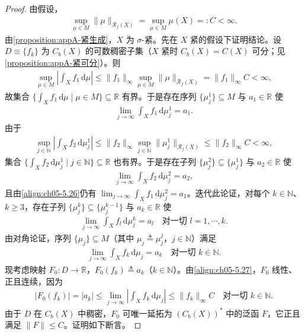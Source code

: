 \documentclass[../../main.tex]{subfiles}%
\begin{document}
\begin{proof}
由假设，
\begin{align}
\sup_{\mu\in M}\|\mu\|_{\mathscr{R}_f(X)}
=\sup_{\mu\in M}\mu(X)=:C<\infty.\label{align:ch05-5.25}
\end{align}
由\cref{proposition:appA-紧生成}，$X$ 为 $\sigma$-紧。先在 $X$ 紧的假设下证明结论。设 $D\equiv\{f_k\}$ 为 $C_b(X)$ 的可数稠密子集（$X$ 紧时 $C_b(X)=C(X)$ 可分；见\cref{proposition:appA-紧可分}）。则
\begin{align*}
\sup_{\mu\in M}\left|\int_X f_1\,\mathrm{d}\mu\right|
\leqslant\|f_1\|_\infty\sup_{\mu\in M}\|\mu\|_{\mathscr{R}_f(X)}
=\|f_1\|_\infty C<\infty,
\end{align*}
故集合 $\{\int_X f_1\,\mathrm{d}\mu\mid\mu\in M\}\subseteq\mathbb{R}$ 有界。于是存在序列 $\{\mu_j^1\}\subseteq M$ 与 $a_1\in\mathbb{R}$ 使
\begin{align}
\lim_{j\to\infty}\int_X f_1\,\mathrm{d}\mu_j^1=a_1.\label{align:ch05-5.26}
\end{align}
由于
\begin{align*}
\sup_{j\in\mathbb{N}}\left|\int_X f_2\,\mathrm{d}\mu_j^1\right|
\leqslant\|f_2\|_\infty\sup_{j\in\mathbb{N}}\|\mu_j^1\|_{\mathscr{R}_f(X)}
\leqslant\|f_2\|_\infty C<\infty,
\end{align*}
集合 $\{\int_X f_2\,\mathrm{d}\mu_j^1\mid j\in\mathbb{N}\}\subseteq\mathbb{R}$ 也有界。于是存在子列 $\{\mu_j^2\}\subseteq\{\mu_j^1\}$ 与 $a_2\in\mathbb{R}$ 使
\begin{align*}
\lim_{j\to\infty}\int_X f_2\,\mathrm{d}\mu_j^2=a_2,
\end{align*}
且由\eqref{align:ch05-5.26}仍有 $\lim_{j\to\infty}\int_X f_1\,\mathrm{d}\mu_j^2=a_1$。迭代此论证，对每个 $k\in\mathbb{N}$、$k\geqslant3$，存在子列 $\{\mu_j^k\}\subseteq\{\mu_j^{k-1}\}$ 与 $a_k\in\mathbb{R}$ 使
\begin{align*}
\lim_{j\to\infty}\int_X f_l\,\mathrm{d}\mu_j^k=a_l
\quad\text{对一切 }l=1,\cdots ,k.
\end{align*}
由对角论证，序列 $\{\mu_j\}\subseteq M$（其中 $\mu_j\triangleq \mu_j^j$，$j\in\mathbb{N}$）满足
\begin{align}
\lim_{j\to\infty}\int_X f_k\,\mathrm{d}\mu_j=a_k
\quad\text{对一切 }k\in\mathbb{N}.\label{align:ch05-5.27}
\end{align}
现考虑映射 $F_0:D\to\mathbb{R}$，$F_0(f_k)\triangleq a_k$（$k\in\mathbb{N}$）。由\eqref{align:ch05-5.27}，$F_0$ 线性、正且连续，因为
\begin{align*}
|F_0(f_k)|=|a_k|
\leqslant\lim_{j\to\infty}\left|\int_X f_k\,\mathrm{d}\mu_j\right|
\leqslant\|f_k\|_\infty C
\quad\text{对一切 }k\in\mathbb{N}.
\end{align*}
由于 $D$ 在 $C_b(X)$ 中稠密，$F_0$ 可唯一延拓为 $(C_b(X))^*$ 中的泛函 $F$，它正且满足 $\|F\|\leqslant C$。证明如下断言。


\end{proof}
\end{document}
